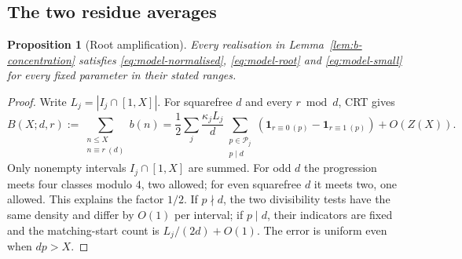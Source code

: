 \documentclass[11pt]{article}
\newtheorem{proposition}[theorem]{Proposition}
\theoremstyle{definition}
\newcommand{\ind}{\mathbf 1}
\theoremstyle{remark}
\numberwithin{equation}{section}
\begin{document}
\subsection{The two residue averages}
\begin{proposition}[Root amplification]\label{prop:b-amplification}
Every realisation in Lemma~\ref{lem:b-concentration} satisfies \eqref{eq:model-normalised},
\eqref{eq:model-root} and \eqref{eq:model-small} for every fixed parameter in their stated ranges.
\end{proposition}
\begin{proof}
Write $L_j=|I_j\cap[1,X]|$. For squarefree $d$ and every $r\bmod d$, CRT gives
\begin{equation}\label{eq:b-progression-mean}
 B(X;d,r):=\sum_{\substack{n\le X\\n\equiv r\ (d)}}b(n)
 =\frac12\sum_j\frac{\kappa_jL_j}{d}
 \sum_{\substack{p\in\mathcal P_j\\p\mid d}}
 (\ind_{r\equiv0\ (p)}-\ind_{r\equiv1\ (p)})+O(Z(X)).
\end{equation}
Only nonempty intervals $I_j\cap[1,X]$ are summed. For odd $d$ the progression meets four classes modulo $4$, two allowed;
for even squarefree $d$ it meets two, one allowed. This explains the factor $1/2$.
If $p\nmid d$, the two divisibility tests have the same density and differ by $O(1)$ per interval;
if $p\mid d$, their indicators are fixed and the matching-start count is $L_j/(2d)+O(1)$.
The error is uniform even when $dp>X$.


\end{proof}
\end{document}
